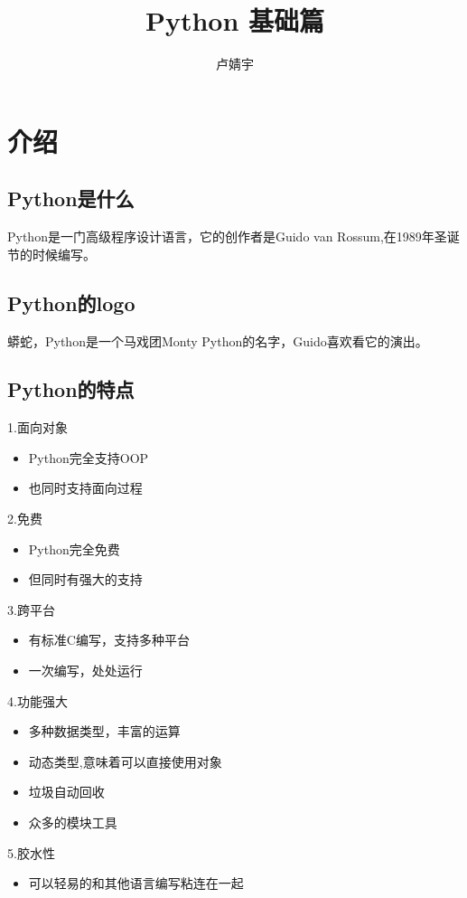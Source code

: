 \documentclass[UTF8]{ctexart}
\title{\heiti Python 基础篇}
\author{卢婧宇}
\begin{document}
\maketitle
\tableofcontents

\newpage
\section{介绍}
\subsection{Python是什么}
Python是一门高级程序设计语言，它的创作者是Guido van Rossum,在1989年圣诞节的时候编写。
\subsection{Python的logo}
蟒蛇，Python是一个马戏团Monty Python的名字，Guido喜欢看它的演出。
\subsection{Python的特点}
1.面向对象
\begin{itemize}
  \item Python完全支持OOP
  \item 也同时支持面向过程
\end{itemize}

2.免费
\begin{itemize}
  \item Python完全免费
  \item 但同时有强大的支持
\end{itemize}

3.跨平台
\begin{itemize}
  \item 有标准C编写，支持多种平台
  \item 一次编写，处处运行
\end{itemize}

4.功能强大
\begin{itemize}
  \item 多种数据类型，丰富的运算
  \item 动态类型,意味着可以直接使用对象
  \item 垃圾自动回收
  \item 众多的模块工具
\end{itemize}

5.胶水性
\begin{itemize}
  \item 可以轻易的和其他语言编写粘连在一起
\end{itemize}
\end{document}
